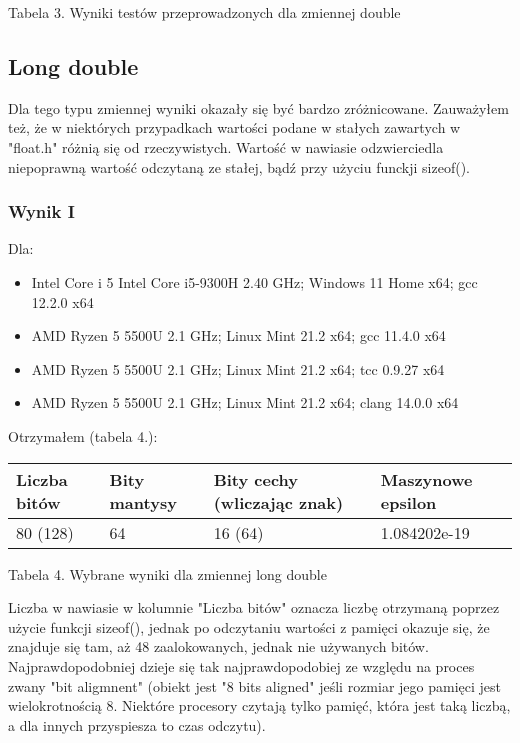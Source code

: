 \documentclass{article}
\begin{document}
\centerline{Tabela 3. Wyniki testów przeprowadzonych dla zmiennej double}

\subsection{Long double}

Dla tego typu zmiennej wyniki okazały się być bardzo zróżnicowane. Zauważyłem też, że w niektórych przypadkach wartości podane w stałych zawartych w "float.h" różnią się od rzeczywistych. Wartość w nawiasie odzwierciedla niepoprawną wartość odczytaną ze stałej, bądź przy użyciu funckji sizeof().

\subsubsection{Wynik I}

Dla:

\begin{itemize}
\item Intel Core i 5 Intel Core i5-9300H 2.40 GHz; Windows 11 Home x64; gcc 12.2.0 x64
\item AMD Ryzen 5 5500U 2.1 GHz; Linux Mint 21.2 x64; gcc 11.4.0 x64
\item AMD Ryzen 5 5500U 2.1 GHz; Linux Mint 21.2 x64; tcc 0.9.27 x64
\item AMD Ryzen 5 5500U 2.1 GHz; Linux Mint 21.2 x64; clang 14.0.0 x64
\end{itemize}

Otrzymałem (tabela 4.):

\begin{table}[!ht]
    \centering
    \begin{tabular}{|l|l|l|l|}
    \hline
        Liczba bitów & Bity mantysy & Bity cechy (wliczając znak) & Maszynowe epsilon  \\ \hline
        80 (128) & 64 & 16 (64) & 1.084202e-19 \\ \hline
    \end{tabular}
\end{table}

\centerline{Tabela 4. Wybrane wyniki dla zmiennej long double}
\bigbreak

\noindent
Liczba w nawiasie w kolumnie "Liczba bitów" oznacza liczbę otrzymaną poprzez użycie funkcji sizeof(), jednak po odczytaniu wartości z pamięci okazuje się, że znajduje się tam, aż 48 zaalokowanych, jednak nie używanych bitów. Najprawdopodobniej dzieje się tak najprawdopodobiej ze względu na proces zwany "bit aligmnent" (obiekt jest "8 bits aligned" jeśli rozmiar jego pamięci jest wielokrotnością 8. Niektóre procesory czytają tylko pamięć, która jest taką liczbą, a dla innych przyspiesza to czas odczytu).
\end{document}

